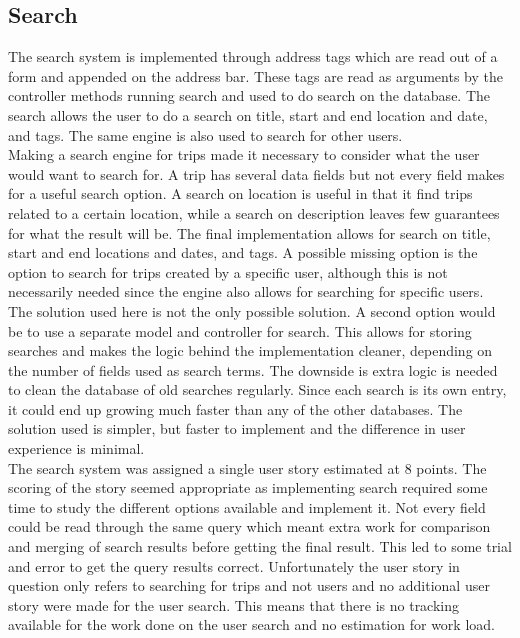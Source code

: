 \documentclass[a4paper]{article}
\begin{document}
\subsection{Search}
The search system is implemented through address tags which are read out of a form and appended on the address bar. These tags are read as arguments by the controller methods running search and used to do search on the database. The search allows the user to do a search on title, start and end location and date, and tags. The same engine is also used to search for other users.\\

\noindent
Making a search engine for trips made it necessary to consider what the user would want to search for. A trip has several data fields but not every field makes for a useful search option. A search on location is useful in that it find trips related to a certain location, while a search on description leaves few guarantees for what the result will be. The final implementation allows for search on title, start and end locations and dates, and tags. A possible missing option is the option to search for trips created by a specific user, although this is not necessarily needed since the engine also allows for searching for specific users.\\

\noindent
The solution used here is not the only possible solution. A second option would be to use a separate model and controller for search. This allows for storing searches and makes the logic behind the implementation cleaner, depending on the number of fields used as search terms. The downside is extra logic is needed to clean the database of old searches regularly. Since each search is its own entry, it could end up growing much faster than any of the other databases. The solution used is simpler, but faster to implement and the difference in user experience is minimal.\\

\noindent
The search system was assigned a single user story estimated at 8 points. The scoring of the story seemed appropriate as implementing search required some time to study the different options available and implement it. Not every field could be read through the same query which meant extra work for comparison and merging of search results before getting the final result. This led to some trial and error to get the query results correct. Unfortunately the user story in question only refers to searching for trips and not users and no additional user story were made for the user search. This means that there is no tracking available for the work done on the user search and no estimation for work load.
\end{document}
